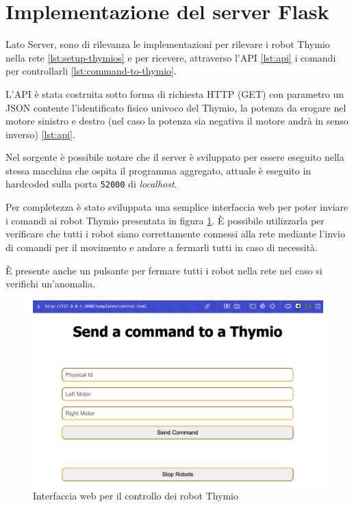\documentclass[12pt,a4paper,openright,twoside]{book}
\begin{document}
\section{Implementazione del server Flask}

Lato Server, sono di rilevanza le implementazioni per rilevare i robot Thymio nella rete \cref{lst:setup-thymios} e per ricevere, attraverso l'API \cref{lst:api} i comandi per controllarli \cref{lst:command-to-thymio}.



L'API è stata costruita sotto forma di richiesta HTTP (GET) con parametro un JSON contente l'identificato fisico univoco del Thymio, la potenza da erogare nel motore sinistro e destro (nel caso la potenza sia negativa il motore andrà in senso inverso) \cref{lst:api}.

Nel sorgente è possibile notare che il server è sviluppato per essere eseguito nella stessa macchina che ospita il programma aggregato, attuale è eseguito in hardcoded sulla porta \verb|52000| di \textit{localhost}.





Per completezza è stato sviluppata una semplice interfaccia web per poter inviare i comandi ai robot Thymio presentata in figura \ref{fig:web-interface}. È possibile utilizzarla per verificare che tutti i robot siano correttamente connessi alla rete mediante l'invio di comandi per il movimento e andare a fermarli tutti in caso di necessità.

È presente anche un pulsante per fermare tutti i robot nella rete nel caso si verifichi un'anomalia.

\begin{figure}
    \centering
    \includegraphics[width=.8\linewidth]{figures/web-interface.png}
    \caption{Interfaccia web per il controllo dei robot Thymio}
    \label{fig:web-interface}
\end{figure}
\end{document}
